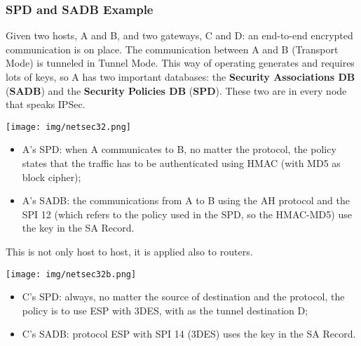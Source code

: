 \documentclass[a4paper, 10pt, titlepage]{article}
\begin{document}
\subsubsection*{SPD and SADB Example}
Given two hosts, A and B, and two gateways, C and D: an end-to-end encrypted communication is on place. The communication between A and B (Transport Mode) is tunneled in Tunnel Mode. This way of operating generates and requires lots of keys, so A has two important databases: the \textbf{Security Associations DB} (\textbf{SADB}) and the \textbf{Security Policies DB} (\textbf{SPD}). These two are in every node that speaks IPSec.
\begin{center}
	\texttt{[image: img/netsec32.png]}
\end{center}
\begin{itemize}
	\item A's SPD: when A communicates to B, no matter the protocol, the policy states that the traffic has to be authenticated using HMAC (with MD5 as block cipher);
	\item A's SADB: the communications from A to B using the AH protocol and the SPI 12 (which refers to the policy used in the SPD, so the HMAC-MD5) use the key in the SA Record.
\end{itemize}
This is not only host to host, it is applied also to routers.
\begin{center}
	\texttt{[image: img/netsec32b.png]}
\end{center}
\begin{itemize}
	\item C's SPD: always, no matter the source of destination and the protocol, the policy is to use ESP  with 3DES, with as the tunnel destination D;
	\item C's SADB: protocol ESP with SPI 14 (3DES) uses the key in the SA Record.
\end{itemize}
\end{document}
